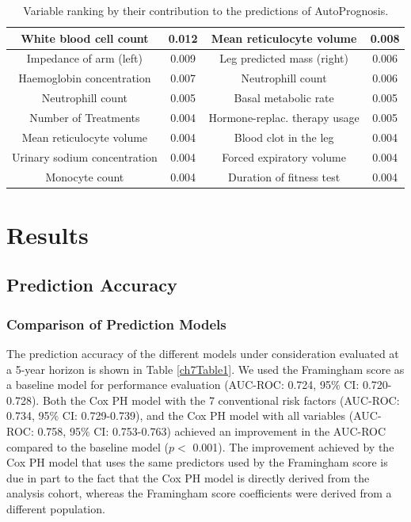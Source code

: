 \documentclass [PhD] {uclathes}
\begin{document}
\begin{table}[t]
\begin{tabular}{|c|c|c|c|}
{\footnotesize White blood cell count} & {\footnotesize 0.012} & {\footnotesize Mean reticulocyte volume} & {\footnotesize 0.008} \\ \hline
{\footnotesize Impedance of arm (left)} & {\footnotesize 0.009} & {\footnotesize Leg predicted mass (right)} & {\footnotesize 0.006} \\ \hline
{\footnotesize Haemoglobin concentration} & {\footnotesize 0.007} & {\footnotesize Neutrophill count} & {\footnotesize 0.006} \\ \hline 
{\footnotesize Neutrophill count} & {\footnotesize 0.005} & {\footnotesize Basal metabolic rate} & {\footnotesize 0.005} \\ \hline
{\footnotesize Number of Treatments} & {\footnotesize 0.004} & {\footnotesize Hormone-replac. therapy usage} & {\footnotesize 0.005} \\ \hline
{\footnotesize Mean reticulocyte volume} & {\footnotesize 0.004} & {\footnotesize Blood clot in the leg} & {\footnotesize 0.004} \\ \hline 
{\footnotesize Urinary sodium concentration} & {\footnotesize 0.004} & {\footnotesize Forced expiratory volume} & {\footnotesize 0.004} \\ \hline
{\footnotesize Monocyte count} & {\footnotesize 0.004} & {\footnotesize Duration of fitness test} & {\footnotesize 0.004} \\ \hline 
\end{tabular}
\caption{Variable ranking by their contribution to the predictions of AutoPrognosis.}
\label{ch7Table2}
\end{table}

\section{Results}
\label{ch7sec3}

\subsection*{Prediction Accuracy}
\subsubsection*{Comparison of Prediction Models} 
The prediction accuracy of the different models under consideration evaluated at a 5-year horizon is shown in Table \ref{ch7Table1}. We used the Framingham score as a baseline model for performance evaluation (AUC-ROC: 0.724, 95$\%$ CI: 0.720-0.728). Both the Cox PH model with the 7 conventional risk factors (AUC-ROC: 0.734, 95$\%$ CI: 0.729-0.739), and the Cox PH model with all variables (AUC-ROC: 0.758, 95$\%$ CI: 0.753-0.763) achieved an improvement in the AUC-ROC compared to the baseline model ($p <$ 0.001). The improvement achieved by the Cox PH model that uses the same predictors used by the Framingham score is due in part to the fact that the Cox PH model is directly derived from the analysis cohort, whereas the Framingham score coefficients were derived from a different population. 
\end{document}
